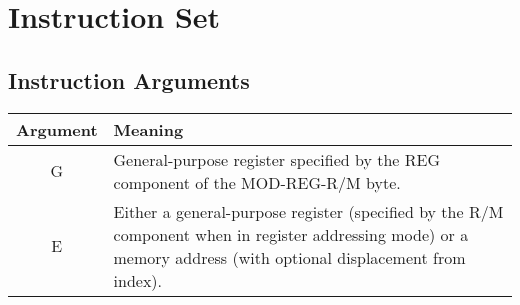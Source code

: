 \section{Instruction Set}
    \subsection{Instruction Arguments}
    \begin{table}[h]
        \begin{tabular} { | c | m{} | }
            \hline
            Argument & Meaning \\
            \hline
            G & General-purpose register specified by the REG component of the MOD-REG-R/M byte. \\
            \hline
            E & Either a general-purpose register (specified by the R/M component when in register addressing mode) or a memory address (with optional displacement from index). \\
            \hline
        \end{tabular}
    \end{table}

